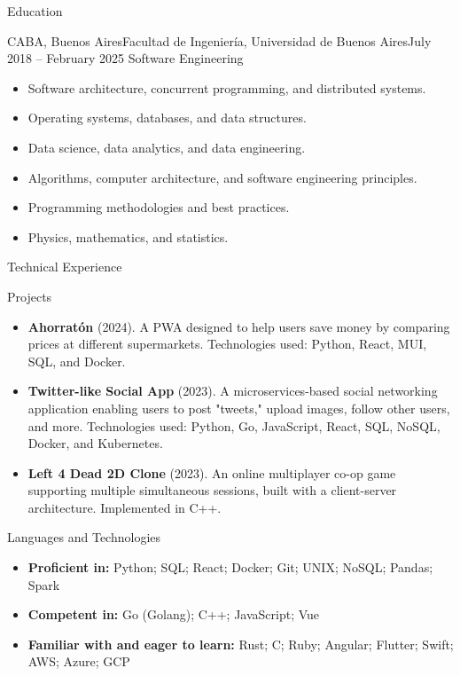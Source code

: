 \documentclass[]{mcdowellcv}
\begin{document}
	\begin{cvsection}{Education}
		\begin{cvsubsection}{CABA, Buenos Aires}{Facultad de Ingeniería, Universidad de Buenos Aires}{July 2018 -- February 2025}
			Software Engineering
			\begin{itemize}
				\item Software architecture, concurrent programming, and distributed systems.
				\item Operating systems, databases, and data structures.
				\item Data science, data analytics, and data engineering.
				\item Algorithms, computer architecture, and software engineering principles.
				\item Programming methodologies and best practices.
				\item Physics, mathematics, and statistics.
			\end{itemize}
		\end{cvsubsection}
	\end{cvsection}	
	
	\begin{cvsection}{Technical Experience}
		\begin{cvsubsection}{Projects}{}{}
			\begin{itemize}
				\item \textbf{Ahorratón} (2024). A PWA designed to help users save money by comparing prices at different supermarkets. Technologies used: Python, React, MUI, SQL, and Docker.
				\item \textbf{Twitter-like Social App} (2023). A microservices-based social networking application enabling users to post "tweets," upload images, follow other users, and more. Technologies used: Python, Go, JavaScript, React, SQL, NoSQL, Docker, and Kubernetes.
				\item \textbf{Left 4 Dead 2D Clone} (2023). An online multiplayer co-op game supporting multiple simultaneous sessions, built with a client-server architecture. Implemented in C++.
			\end{itemize}
		\end{cvsubsection}
	\end{cvsection}
	
	\begin{cvsection}{Languages and Technologies}
		\begin{cvsubsection}{}{}{}
			\begin{itemize}
				\item \textbf{Proficient in:}
				\subitem Python; SQL; React; Docker; Git; UNIX; NoSQL; Pandas; Spark
				\item \textbf{Competent in:}
				\subitem Go (Golang); C++; JavaScript; Vue
				\item \textbf{Familiar with and eager to learn:}
				\subitem Rust; C; Ruby; Angular; Flutter; Swift; AWS; Azure; GCP
			\end{itemize}
		\end{cvsubsection}
	\end{cvsection}
	
	
\end{document}
